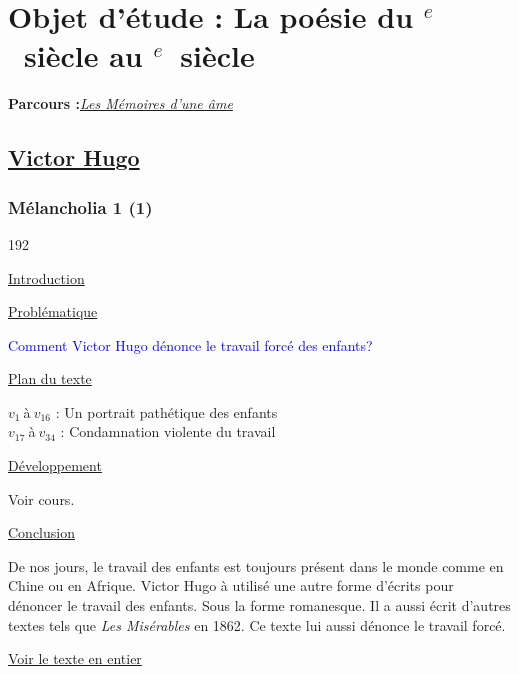 \documentclass[12pt,a4paper]{article}
\begin{document}
\begin{center}
\setcounter{tocdepth}{4}								%
\renewcommand{\contentsname}{Sommaire}					%
\tableofcontents										%
\end{center}
\newpage
		\section[Les M\'emoires d'une \^ame]{Objet d'\'etude : La po\'esie du \textsc{}$^{e}$~siècle au \textsc{}$^{e}$~siècle}
		\textbf{Parcours :}\textit{\underline{Les M\'emoires d'une \^ame}}
			\subsection{\href{.extra/Bio/Hugo.pdf}{Victor Hugo}}
				\subsubsection{M\'elancholia 1 (1) }
\begin{dingautolist}{192}

\item \underline{Introduction} \par


\item \underline{Probl\'ematique }\par
	\textcolor{blue}{Comment Victor Hugo d\'enonce le travail forc\'e des enfants?}
\item \underline{Plan du texte} \par
		$v_{1}~$\`a$~v_{16}$ : Un portrait path\'etique des enfants\\
        $v_{17}~$\`a$~v_{34}$ : Condamnation violente du travail 
	

\item \underline{D\'eveloppement} \par
	Voir cours.

\item \underline{Conclusion} \par
	De nos jours, le travail des enfants est toujours pr\'esent dans le monde comme en Chine ou en Afrique. Victor Hugo \`a utilis\'e une autre forme d'\'ecrits pour d\'enoncer le travail des enfants. Sous la forme romanesque. Il a aussi \'ecrit d'autres textes tels que \textit{Les Mis\'erables} en 1862. Ce texte lui aussi d\'enonce le travail forc\'e.
\end{dingautolist}
\href{.extra/Textes/Melancholia.pdf}{Voir le texte en entier}
 \newpage
\end{document}
